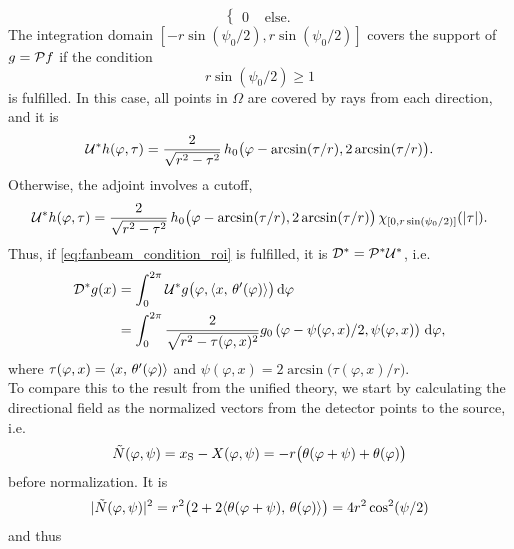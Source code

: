 \documentclass{amsart}
\renewcommand*{\phi}{\varphi}
\begin{document}
\begin{example}
\begin{equation*}
\begin{cases}
   0 & \text{ else}.
  \end{cases}
 \end{equation*}
 The integration domain $[-r\sin(\psi_0/2), r\sin(\psi_0/2)]$ covers the support of $g = {\mathcal{P}} f$ if the condition
 \begin{equation}
  \label{eq:fanbeam_condition_roi}
  r \sin(\psi_0/2) \geq 1
 \end{equation}
 is fulfilled. In this case, all points in $\Omega$ are covered by rays from each direction, and it is
 \begin{equation}
  \label{eq:fanbeam_unit_trafo_adj_good}
  \DUALOPU h(\phi, \tau) = \frac{2}{\sqrt{r^2-\tau^2}} \, h_0\big(\phi - \arcsin(\tau/r), 2\arcsin(\tau/r)\big).
 \end{equation}
 Otherwise, the adjoint involves a cutoff,
 \begin{equation}
  \label{eq:fanbeam_unit_trafo_adj_bad}
  \DUALOPU h(\phi, \tau) = \frac{2}{\sqrt{r^2-\tau^2}} \, h_0\big(\phi - \arcsin(\tau/r), 2\arcsin(\tau/r)\big)\, 
  \chi_{[0, r\sin(\psi_0/2)]}(\ABS{\tau}).
 \end{equation}
 Thus, if \eqref{eq:fanbeam_condition_roi} is fulfilled, it is ${{\mathcal{D}}^*} = {{\mathcal{P}}^*}{{\mathcal{U}}^*}$, i.e.
 \begin{align}
  \DUALOPD g(x)
  &= \int_0^{2\pi} \DUALOPU g\big(\phi, \INNER{x}{\theta'(\phi)}\big)\, \D\phi \notag\\
  \label{eq:fanbeam_backproj}
  &= \int_0^{2\pi} \frac{2}{\sqrt{r^2-\tau(\phi, x)^2}} g_0\left(\phi - \psi(\phi,x)/2, \psi(\phi,x) \right)\, \D\phi,
 \end{align}
 where $\tau(\phi,x) = \INNER{x}{\theta'(\phi)}$ and $\psi(\phi,x) = 2\arcsin\big(\tau(\phi,x)/r\big)$.\\[1ex]
 To compare this to the result from the unified theory, we start by calculating the directional field as the normalized vectors from the 
 detector points to the source, i.e.
 \begin{equation*}
  \tilde N(\phi, \psi) 
  = x_{\mathrm{S}} - X(\phi, \psi) \\
  = - r \big(\theta(\phi + \psi) + \theta(\phi)\big)
 \end{equation*}
 before normalization. It is
 \begin{align*}
  \ABS{\tilde N(\phi, \psi)}^2 = r^2 \big(2 + 2\INNER{\theta(\phi + \psi)}{\theta(\phi)} \big) = 4 r^2 \cos^2(\psi/2)
 \end{align*}
 and thus
 \begin{equation*}

\end{equation*}
\end{example}
\end{document}
